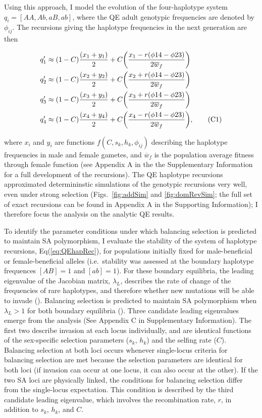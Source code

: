 \documentclass{article}
\newcommand\numberthis{\addtocounter{equation}{1}\tag{\theequation}}
\begin{document}
Using this approach, I model the evolution of the four-haplotype system $q_i = [AA, Ab, aB, ab]$, where the QE adult genotypic frequencies are denoted by $\phi_{ij}$. The recursions giving the haplotype frequencies in the next generation are then

\begin{align*} \label{eq:QEhapRec}
	q'_1 &\approx (1 - C) \frac{(x_1 + y_1)}{2} + C \bigg( \frac{x_1 - r(\phi{14} - \phi{23})}{2 \overline{w}_f} \bigg) \\
	q'_2 &\approx (1 - C) \frac{(x_2 + y_2)}{2} + C \bigg( \frac{x_2 + r(\phi{14} - \phi{23})}{2 \overline{w}_f} \bigg) \\
	q'_3 &\approx (1 - C) \frac{(x_3 + y_3)}{2} + C \bigg( \frac{x_3 + r(\phi{14} - \phi{23})}{2 \overline{w}_f} \bigg) \\
	q'_4 &\approx (1 - C) \frac{(x_4 + y_4)}{2} + C \bigg( \frac{x_4 - r(\phi{14} - \phi{23})}{2 \overline{w}_f} \bigg), \numberthis
\end{align*}

\noindent{} where $x_i$ and $y_i$ are functions $f(C, s_k, h_k, \phi_{ij})$ describing the haplotype frequencies in male and female gametes, and $\overline{w}_f$ is the population average fitness through female function (see Appendix A in the the Supplementary Information for a full development of the recursions). The QE haplotype recursions approximated determininstic simulations of the genotypic recursions very well, even under strong selection (Figs.~\ref{fig:addSim} and \ref{fig:domRevSim}; the full set of exact recursions can be found in Appendix A in the Supporting Information); I therefore focus the analysis on the analytic QE results. 

To identify the parameter conditions under which balancing selection is predicted to maintain SA polymorphism, I evaluate the stability of the system of haplotype recursions, Eq(\ref{eq:QEhapRec}), for populations initially fixed for male-beneficial or female-beneficial alleles (i.e.~stability was assessed at the boundary haplotype frequences $[AB]=1$ and $[ab]=1$). For these boundary equilibria, the leading eigenvalue of the Jacobian matrix, $\lambda_L$, describes the rate of change of the frequencies of rare haplotypes, and therefore whether new mutations will be able to invade (\citealt{OttoDay2007}). Balancing selection is predicted to maintain SA polymorphism when $\lambda_L > 1$ for both boundary equilibria (\citealt{Prout1968}). Three candidate leading eigenvalues emerge from the analysis (See Appendix C in Supplementary Information). The first two describe invasion at each locus individually, and are identical functions of the sex-specific selection parameters ($s_k$, $h_k$) and the selfing rate ($C$). Balancing selection at both loci occurs whenever single-locus criteria for balancing selection are met because the selection parameters are identical for both loci (if invasion can occur at one locus, it can also occur at the other). If the two SA loci are physically linked, the conditions for balancing selection differ from the single-locus expectation. This condition is described by the third candidate leading eigenvalue, which involves the recombination rate, $r$, in addition to $s_k$, $h_k$, and $C$.
\end{document}
